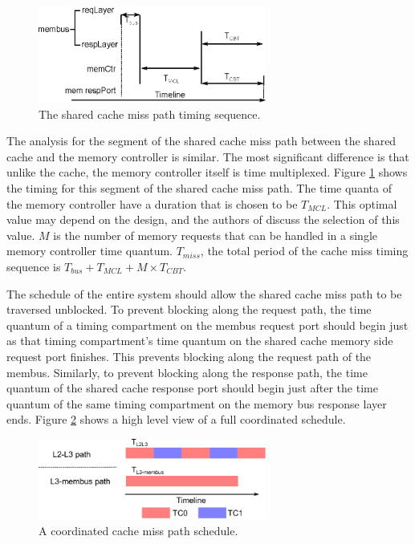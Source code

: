 \begin{figure}
    \begin{center}
        \includegraphics[width=2.9475in]{figs/miss_timing.eps}
        \caption{The shared cache miss path timing sequence.}
        \label{fig:miss_timing}
    \end{center}
\end{figure}

The analysis for the segment of the shared cache miss path between the shared 
cache and the memory controller is similar. The most significant difference is 
that unlike the cache, the memory controller itself is time multiplexed. Figure 
\ref{fig:miss_timing} shows the timing for this segment of the shared cache 
miss path. The time quanta of the memory controller have a duration that is 
chosen to be $T_{MCL}$. This optimal value may depend on the design, and
the authors of \cite{ushpca14} discuss the selection of this value. $M$ is the 
number of memory requests that can be handled in a single memory controller 
time quantum.
$T_{miss}$, the total period of the cache miss timing sequence is 
$T_{bus}+T_{MCL}+M\times T_{CBT}$.

The schedule of the entire system should allow the shared cache miss path to be 
traversed unblocked.
To prevent blocking along the request path, the time quantum of a timing 
compartment on the membus request port should begin just as that timing 
compartment's time quantum on the shared cache memory side request port 
finishes. This prevents blocking along the request path of the membus.
Similarly, to prevent blocking along the response path, the time quantum of the 
shared cache response port should begin just after the time quantum of the same 
timing compartment on the memory bus response layer ends. Figure 
\ref{fig:coordination}
shows a high level view of a full coordinated schedule.

\begin{figure}
    \begin{center}
        \includegraphics[width=2.9475in]{figs/coordination.eps}
        \caption{A coordinated cache miss path schedule.}
        \label{fig:coordination}
    \end{center}
\end{figure}


